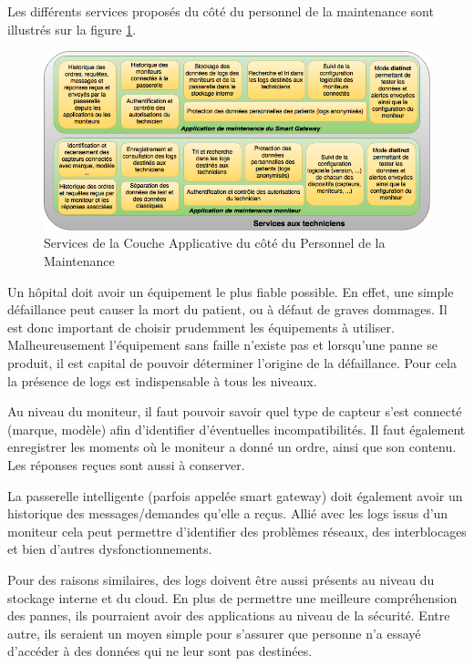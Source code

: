 Les différents services proposés du côté du personnel de la maintenance sont illustrés sur la figure \ref{maintenance}.
\newline
\begin{figure}[h!]
	\hspace*{-2.5cm}
	\centering
	\includegraphics[width=1.4\textwidth]{maintenance.png}
	\caption{Services de la Couche Applicative du côté du Personnel de la Maintenance}
	\label{maintenance}
\end{figure}

Un hôpital doit avoir un équipement le plus fiable possible. En effet, une simple défaillance peut causer la mort du patient, ou
à défaut de graves dommages. Il est donc important de choisir prudemment les équipements à utiliser. Malheureusement l'équipement
sans faille n'existe pas et lorsqu'une panne se produit, il est capital de pouvoir déterminer l'origine de la défaillance. Pour
cela la présence de logs est indispensable à tous les niveaux. 
\newline

Au niveau du moniteur, il faut pouvoir savoir quel type de capteur s'est connecté (marque, modèle) afin d'identifier d'éventuelles
incompatibilités. Il faut également enregistrer les moments où le moniteur a donné un ordre, ainsi que son contenu.
Les réponses reçues sont aussi à conserver.
\newline

La passerelle intelligente (parfois appelée smart gateway) doit également avoir un historique des messages/demandes qu'elle a
reçus. Allié avec les logs issus d'un moniteur cela peut permettre d'identifier des problèmes réseaux, des interblocages et bien
d'autres dysfonctionnements.
\newline 

Pour des raisons similaires, des logs doivent être aussi présents au niveau du stockage interne et du cloud. En plus de permettre
une meilleure compréhension des pannes, ils pourraient avoir des applications au niveau de la sécurité. Entre autre, ils seraient
un moyen simple pour s'assurer que personne n'a essayé d'accéder à des données qui ne leur sont pas destinées.
\newline

